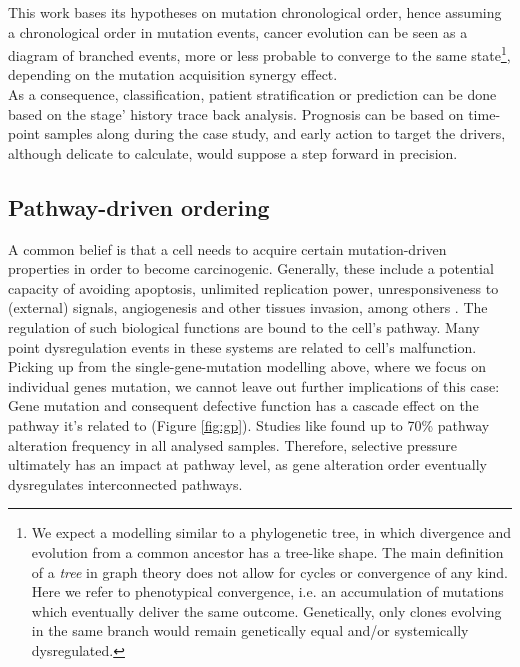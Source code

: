 This work bases its hypotheses on mutation chronological order, hence assuming a chronological order in mutation events, cancer evolution can be seen as a diagram of branched events, more or less probable to converge to the same state\footnote{We expect a modelling similar to a phylogenetic tree, in which divergence and evolution from a common ancestor has a tree-like shape. The main definition of a \emph{tree} in graph theory does not allow for cycles or convergence of any kind. Here we refer to phenotypical convergence, i.e. an accumulation of mutations which eventually deliver the same outcome. Genetically, only clones evolving in the same branch would remain genetically equal and/or systemically dysregulated.}, depending on the mutation acquisition synergy effect.
\\

As a consequence, classification, patient stratification or prediction can be done based on the stage’ history trace back analysis. Prognosis can be based on time-point samples \cite{Spencer2006ModelingTumorigenesis} along during the case study, and early action to target the drivers, although delicate to calculate, would suppose a step forward in precision. 
\\

\subsection{Pathway-driven ordering}
A common belief is that a cell needs to acquire certain mutation-driven properties in order to become carcinogenic. Generally, these include a potential capacity of avoiding apoptosis, unlimited replication power, unresponsiveness to (external) signals, angiogenesis and other tissues invasion, among others \cite{Hanahan2011HallmarksGeneration}. The regulation of such biological functions are bound to the cell’s pathway. Many point dysregulation events in these systems are related to cell’s malfunction.
\\

Picking up from the single-gene-mutation modelling above, where we focus on individual genes mutation, we cannot leave out further implications of this case: Gene mutation and consequent defective function has a cascade effect on the pathway it's related to (Figure \ref{fig:gp}). Studies like \cite{Gerstung2011TheTumorigenesis} found up to 70\% pathway alteration frequency in all analysed samples. Therefore, selective pressure ultimately has an impact at pathway level, as gene alteration order eventually dysregulates interconnected pathways.
\\

